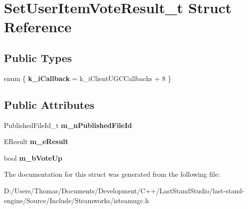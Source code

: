 \hypertarget{structSetUserItemVoteResult__t}{}\section{Set\+User\+Item\+Vote\+Result\+\_\+t Struct Reference}
\label{structSetUserItemVoteResult__t}
\subsection*{Public Types}
\begin{DoxyCompactItemize}
\item 
\hypertarget{structSetUserItemVoteResult__t_a34dca5874fd2c008cb2c4026f591b2dd}{}enum \{ {\bfseries k\+\_\+i\+Callback} = k\+\_\+i\+Client\+U\+G\+C\+Callbacks + 8
 \}\label{structSetUserItemVoteResult__t_a34dca5874fd2c008cb2c4026f591b2dd}

\end{DoxyCompactItemize}
\subsection*{Public Attributes}
\begin{DoxyCompactItemize}
\item 
\hypertarget{structSetUserItemVoteResult__t_a788cee1405fa61c5fa3e0b70cb7e0035}{}Published\+File\+Id\+\_\+t {\bfseries m\+\_\+n\+Published\+File\+Id}\label{structSetUserItemVoteResult__t_a788cee1405fa61c5fa3e0b70cb7e0035}

\item 
\hypertarget{structSetUserItemVoteResult__t_ac0a2570c4b893bab50fdcdb3d86a35fc}{}E\+Result {\bfseries m\+\_\+e\+Result}\label{structSetUserItemVoteResult__t_ac0a2570c4b893bab50fdcdb3d86a35fc}

\item 
\hypertarget{structSetUserItemVoteResult__t_a8d10cf12024b9c065e4a6d3f00103aa0}{}bool {\bfseries m\+\_\+b\+Vote\+Up}\label{structSetUserItemVoteResult__t_a8d10cf12024b9c065e4a6d3f00103aa0}

\end{DoxyCompactItemize}


The documentation for this struct was generated from the following file\+:\begin{DoxyCompactItemize}
\item 
D\+:/\+Users/\+Thomas/\+Documents/\+Development/\+C++/\+Last\+Stand\+Studio/last-\/stand-\/engine/\+Source/\+Include/\+Steamworks/isteamugc.\+h\end{DoxyCompactItemize}
